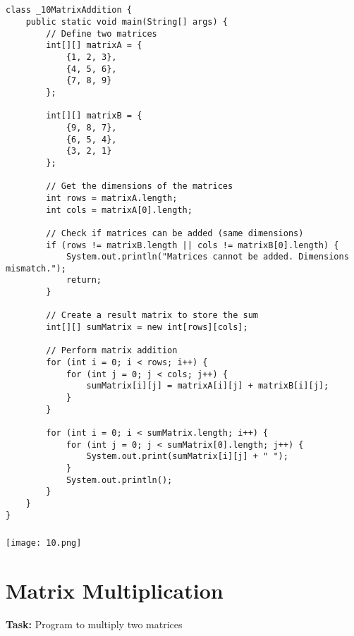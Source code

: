 \documentclass[12pt,a4paper]{article}
\begin{document}
\subsection{}
\begin{lstlisting}
class _10MatrixAddition {
    public static void main(String[] args) {
        // Define two matrices
        int[][] matrixA = {
            {1, 2, 3},
            {4, 5, 6},
            {7, 8, 9}
        };
    
        int[][] matrixB = {
            {9, 8, 7},
            {6, 5, 4},
            {3, 2, 1}
        };
    
        // Get the dimensions of the matrices
        int rows = matrixA.length;
        int cols = matrixA[0].length;
    
        // Check if matrices can be added (same dimensions)
        if (rows != matrixB.length || cols != matrixB[0].length) {
            System.out.println("Matrices cannot be added. Dimensions mismatch.");
            return;
        }
    
        // Create a result matrix to store the sum
        int[][] sumMatrix = new int[rows][cols];
    
        // Perform matrix addition
        for (int i = 0; i < rows; i++) {
            for (int j = 0; j < cols; j++) {
                sumMatrix[i][j] = matrixA[i][j] + matrixB[i][j];
            }
        }
    
        for (int i = 0; i < sumMatrix.length; i++) {
            for (int j = 0; j < sumMatrix[0].length; j++) {
                System.out.print(sumMatrix[i][j] + " ");
            }
            System.out.println();
        }
    }
}
\end{lstlisting}

\subsubsection{}
\begin{center}
    \texttt{[image: 10.png]}
\end{center}


\section{Matrix Multiplication}
\textbf{Task:} Program to multiply two matrices
\end{document}
